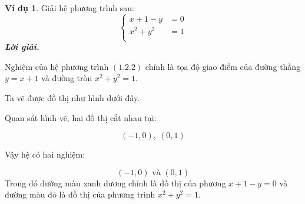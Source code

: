 \documentclass[12pt,a4paper,oneside]{book}
\theoremstyle{theorem}
\theoremstyle{definition}
\newtheorem{vd}[theorem2]{Ví dụ}
\begin{document}
\begin{vd} Giải hệ phương trình sau:
\begin{equation}
        \left\{\begin{array}{lcl}
x+1-y&=0 \\
x^2+y^2&=1 \\
\end{array}
\right.
       \end{equation}
       \textbf{\textit{Lời giải.}}

    
Nghiệm của hệ phương trình $(1.2.2)$ chính là tọa độ giao điểm của đường thẳng $y=x+1$ và đường tròn $x^2+y^2=1$.


Ta vẽ được đồ thị như hình dưới đây.
\begin{center}
\end{center}

Quan sát hình vẽ, hai đồ thị cắt nhau tại:

\[
(-1,0),\ (0,1)
\]

Vậy hệ có hai nghiệm:

\[
\boxed{(-1,0)\text{ và }(0,1)}
\]
Trong đó đường màu xanh dương chính là đồ thị của phương  $x+1-y=0$
và đường màu đỏ là đồ thị của phương trình $x^2+y^2=1$.

\end{vd}
\end{document}
